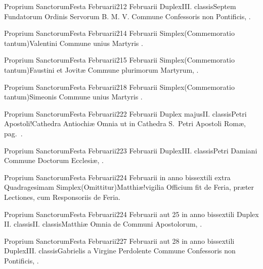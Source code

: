 \documentclass[nocturnale-romanum.tex]{subfiles}
\begin{document}
	{Proprium Sanctorum}{Festa Februarii}{2}{12 Februarii}
	{Duplex}{III. classis}{Septem Fundatorum Ordinis Servorum B. M. V.}
	{Commune Confessoris non Pontificis, \pageref{M-CONP}.}
	{}

	{Proprium Sanctorum}{Festa Februarii}{2}{14 Februarii}
	{Simplex}{(Commemoratio tantum)}{Valentini}
	{Commune unius Martyris \pageref{M-UMEX}.}
	{}

	{Proprium Sanctorum}{Festa Februarii}{2}{15 Februarii}
	{Simplex}{(Commemoratio tantum)}{Faustini et Jovitæ}
	{Commune plurimorum Martyrum, \pageref{M-PMEX}.}
	{}

	{Proprium Sanctorum}{Festa Februarii}{2}{18 Februarii}
	{Simplex}{(Commemoratio tantum)}{Simeonis}
	{Commune unius Martyris \pageref{M-UMEX}.}
	{}

	{Proprium Sanctorum}{Festa Februarii}{2}{22 Februarii}
	{Duplex majus}{II. classis}{Petri Apostoli!Cathedra Antiochiæ}
	{Omnia ut in Cathedra S.\ Petri Apostoli Romæ, pag.\ \pageref{M-0118}.}
	{}

	{Proprium Sanctorum}{Festa Februarii}{2}{23 Februarii}
	{Duplex}{III. classis}{Petri Damiani}
	{Commune Doctorum Ecclesiæ, \pageref{M-CODO}.}
	{}

	{Proprium Sanctorum}{Festa Februarii}{2}{24 Februarii in anno bissextili extra Quadragesimam}
	{Simplex}{(Omittitur)}{Matthiæ!vigilia}
	{Officium fit de Feria, præter Lectiones, cum Responsoriis de Feria.}
	{}

	{Proprium Sanctorum}{Festa Februarii}{2}{24 Februarii aut 25 in anno bissextili}
	{Duplex II. classis}{II. classis}{Matthiæ}
	{Omnia de Communi Apostolorum, \pageref{M-APEX}.}
	{}

	{Proprium Sanctorum}{Festa Februarii}{2}{27 Februarii aut 28 in anno bissextili}
	{Duplex}{III. classis}{Gabrielis a Virgine Perdolente}
	{Commune Confessoris non Pontificis, \pageref{M-CONP}.}
	{}
\end{document}
